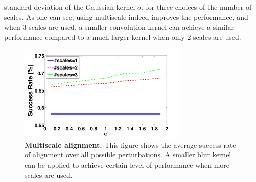 \documentclass[12pt,journal,draftcls,letterpaper,onecolumn]{IEEEtran}
\begin{document}
standard deviation of the Gaussian kernel $\sigma$, for
three choices of the number of scales. As one can see,
using multiscale indeed improves the performance, and when
3 scales are used, a smaller convolution kernel can achieve
a similar performance compared to a much larger kernel when
only 2 scales are used.
\begin{figure}
\centering
\includegraphics[height=1.8in]{figures_pami/multiscale.png}
\vspace{-.3in}
\caption{{\bf Multiscale alignment.} This figure shows the average success rate of alignment over all possible perturbations. A smaller blur kernel can be applied to achieve certain level of performance when more scales are used.}
\label{fig:multiscale}
\vspace{-.5in}
\end{figure}
\end{document}
